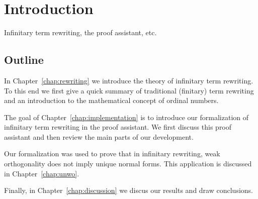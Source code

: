 \chapter{Introduction}

Infinitary term rewriting, the \Coq proof assistant, etc.


\section*{Outline}

In Chapter~\ref{chap:rewriting} we introduce the theory of infinitary term
rewriting. To this end we first give a quick summary of traditional (finitary)
term rewriting and an introduction to the mathematical concept of ordinal
numbers.

The goal of Chapter~\ref{chap:implementation} is to introduce our formalization
of infinitary term rewriting in the \Coq proof assistant. We first discuss this
proof assistant and then review the main parts of our development.

Our formalization was used to prove that in infinitary rewriting, weak
orthogonality does not imply unique normal forms. This application is
discussed in Chapter~\ref{chap:unwo}.

Finally, in Chapter~\ref{chap:discussion} we discus our results and draw
conclusions.
